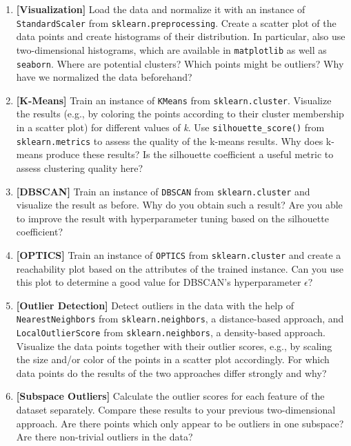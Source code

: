 \documentclass[12pt]{article}
\newcommand{\code}[1]{\textcolor{kitgreen}{\texttt{#1}}}
\newcommand{\taskname}[1]{\textcolor{kitblue}{\textbf{[#1]}}}
\begin{document}
\begin{enumerate}[label=\alph*), left=0pt, itemsep=12pt]
	\item
	\taskname{Visualization}
	Load the data and normalize it with an instance of \code{StandardScaler} from \code{sklearn.preprocessing}.
	Create a scatter plot of the data points and create histograms of their distribution.
	In particular, also use two-dimensional histograms, which are available in \code{matplotlib} as well as \code{seaborn}.
	\newline
	Where are potential clusters?
	Which points might be outliers?
	Why have we normalized the data beforehand?
	\item
	\taskname{K-Means}
	Train an instance of \code{KMeans} from \code{sklearn.cluster}.
	Visualize the results (e.g., by coloring the points according to their cluster membership in a scatter plot) for different values of \textit{k}.
	Use \code{silhouette\_score()} from \code{sklearn.metrics} to assess the quality of the k-means results.
	\newline
	Why does k-means produce these results?
	Is the silhouette coefficient a useful metric to assess clustering quality here?
	\item
	\taskname{DBSCAN}
	Train an instance of \code{DBSCAN} from \code{sklearn.cluster} and visualize the result as before.
	\newline
	Why do you obtain such a result?
	Are you able to improve the result with hyperparameter tuning based on the silhouette coefficient?
	\item
	\taskname{OPTICS}
	Train an instance of \code{OPTICS} from \code{sklearn.cluster} and create a reachability plot based on the attributes of the trained instance.
	\newline
	Can you use this plot to determine a good value for DBSCAN's hyperparameter $\epsilon$?
	\item
	\taskname{Outlier Detection}
	Detect outliers in the data with the help of \code{NearestNeighbors} from \code{sklearn.neighbors}, a distance-based approach, and \code{LocalOutlierScore} from \code{sklearn.neighbors}, a density-based approach.
	Visualize the data points together with their outlier scores, e.g., by scaling the size and/or color of the points in a scatter plot accordingly.
	\newline
	For which data points do the results of the two approaches differ strongly and why?
	\item
	\taskname{Subspace Outliers}
	Calculate the outlier scores for each feature of the dataset separately.
	Compare these results to your previous two-dimensional approach.
	\newline
	Are there points which only appear to be outliers in one subspace?
	Are there non-trivial outliers in the data?
\end{enumerate}
\end{document}
